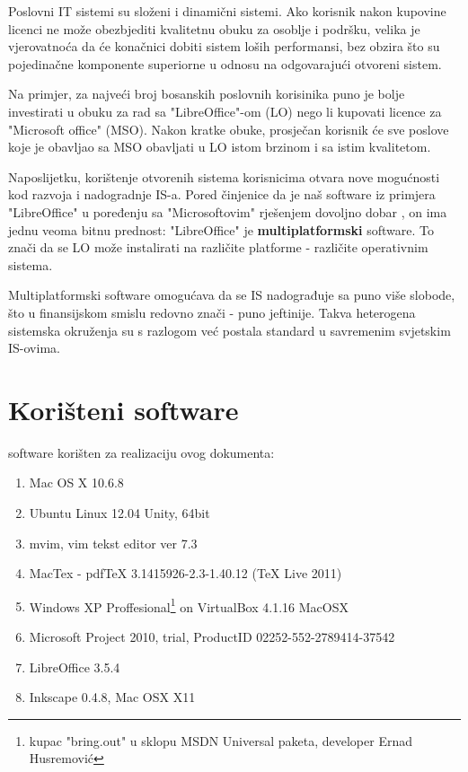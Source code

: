 \documentclass[times, utf8, seminar]{fit}
\begin{document}
Poslovni IT sistemi su složeni i dinamični sistemi. Ako korisnik nakon kupovine licenci ne može obezbjediti kvalitetnu obuku za osoblje i podršku, velika je vjerovatnoća da će konačnici dobiti sistem loših performansi, bez obzira što su pojedinačne komponente superiorne u odnosu na odgovarajući otvoreni sistem.

Na primjer, za najveći broj bosanskih poslovnih korisinika puno je bolje investirati u obuku za rad sa "LibreOffice"-om (LO) nego li kupovati licence za "Microsoft office" (MSO). Nakon kratke obuke, prosječan korisnik će sve poslove koje je obavljao sa MSO obavljati u LO istom brzinom i sa istim kvalitetom.

Naposlijetku, korištenje otvorenih sistema korisnicima otvara nove mogućnosti kod razvoja i nadogradnje IS-a.
Pored činjenice da je naš software iz primjera "LibreOffice" u poređenju sa "Microsoftovim" rješenjem dovoljno dobar , on ima jednu veoma bitnu prednost: "LibreOffice" je \textbf{multiplatformski} software. To znači da se LO može instalirati na različite platforme - različite operativnim sistema.

Multiplatformski software omogućava da se IS nadograđuje sa puno više slobode, što u finansijskom smislu redovno znači - puno jeftinije. Takva heterogena sistemska okruženja su s razlogom već postala standard u savremenim svjetskim IS-ovima.  




\appendix

\chapter{Korišteni software}
software korišten za realizaciju ovog dokumenta:
\begin{enumerate}
  \item Mac OS X 10.6.8
  \item Ubuntu Linux 12.04 Unity, 64bit
  \item mvim, vim tekst editor ver 7.3
  \item MacTex - pdfTeX 3.1415926-2.3-1.40.12 (TeX Live 2011)
  \item Windows XP Proffesional\footnote{kupac "bring.out" u sklopu MSDN Universal paketa, developer Ernad Husremović} on VirtualBox 4.1.16 MacOSX 
  \item Microsoft Project 2010, trial, ProductID 02252-552-2789414-37542
  \item LibreOffice 3.5.4
  \item Inkscape 0.4.8, Mac OSX X11
\end{enumerate}
\end{document}
